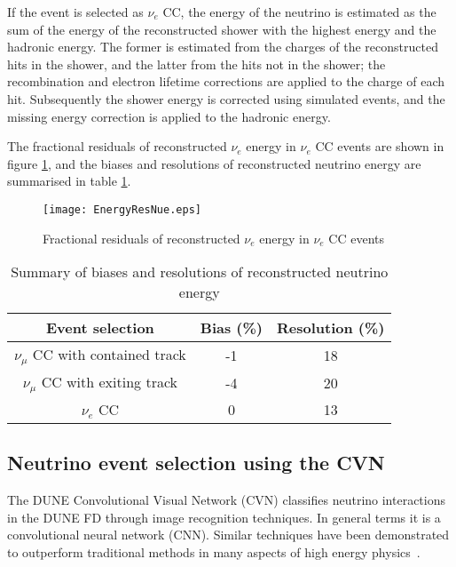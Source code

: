 If the event is selected as $\nu_{e}$ CC, the energy of the 
neutrino is estimated as the sum of the energy of the reconstructed shower with the highest energy and the hadronic energy. The former is estimated from the charges of the reconstructed 
hits in the shower, and the latter from the hits not in the shower; the recombination and electron lifetime corrections are applied to the charge of each hit. Subsequently the shower 
energy is corrected using simulated events, and the missing energy correction is applied to the hadronic energy.

The fractional residuals of reconstructed $\nu_{e}$ energy in $\nu_{e}$ CC events are shown in figure \ref{fig:enresnue}, and the biases and resolutions of reconstructed neutrino energy 
are summarised in table \ref{tab:ressummary}.

\begin{figure}[h]
    \centering
        \texttt{[image: EnergyResNue.eps]}
        \caption{Fractional residuals of reconstructed $\nu_{e}$ energy in $\nu_{e}$ CC events}
        \label{fig:enresnue}
\end{figure}

\begin{table}[h]
\begin{center}
\begin{tabular}{|c|c|c|}
\hline  
 Event selection  &   Bias (\%) & Resolution (\%) \\ \hline
\hline
 $\nu_{\mu}$ CC with contained track  &   -1  &  18   \\ \hline
 $\nu_{\mu}$ CC with exiting track  &  -4   &  20 \\ \hline
 $\nu_{e}$ CC    &  0 & 13    \\ \hline
\end{tabular}
\caption{Summary of biases and resolutions of reconstructed neutrino energy}
\label{tab:ressummary}
\end{center}
\end{table}


\subsection{Neutrino event selection using the CVN}
The DUNE Convolutional Visual Network (CVN) classifies neutrino interactions in the DUNE FD through image recognition techniques. In general terms it is a convolutional neural network (CNN). Similar techniques have been demonstrated to outperform traditional methods in many aspects of high energy physics~\cite{radovicNature}.


